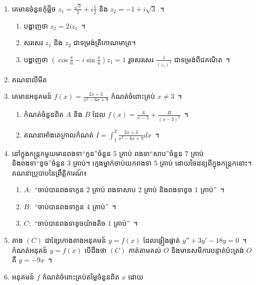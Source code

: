 \documentclass[11pt,a4paper]{myclass}
\begin{document}
	\begin{enumerate}
		\item គេមានចំនួនកុំផ្លិច $ z_1=\frac{\sqrt{3}}{2}+i\frac{1}{2} $ និង $ z_2=-1+i\sqrt{3} $~។
		\begin{enumerate}
			\item បង្ហាញថា $ z_2=2iz_1 $~។
			\item សរសេរ $ z_1 $ និង $ z_2 $ ជាទម្រង់ត្រីកោណមាត្រ។
			\item បង្ហាញថា $ \left(\cos\frac{\pi}{6}-i\sin\frac{\pi}{6}\right)z_1=1 $ រួចសរសេរ $ \frac{1}{(z_1)^4} $ ជាទម្រង់ពីជគណិត~។
		\end{enumerate}
		\item គណនាលីមីត
		\item គេមានអនុគមន៍ $ f(x)=\frac{2x+3}{x^2-6x+9} $ កំណត់ចំពោះគ្រប់ $ x\neq 3 $~។
		\begin{enumerate}
			\item កំណត់ចំនួនពិត $ A $ និង $ B $ ដែល $ f(x)=\frac{A}{x-3}+\frac{B}{(x-3)^2} $~។
			\item គណនាអាំងតេក្រាលកំណត់ $ I=\int_{1}^{2}\frac{2x+3}{x^2-6x+9}dx $~។
		\end{enumerate}
		\item នៅក្នុងកន្ត្រកមួយមានពងទា``កូន''ចំនួន $ 5 $ គ្រាប់ ពងទា``សាប''ចំនួន $ 7 $ គ្រាប់ និងពងទា``ខូច''ចំនួន $ 3 $ គ្រាប់។ ក្មេងម្នាក់ចាប់យកពងទា $ 5 $ គ្រាប់ ដោយចៃដន្យពីក្នុងកន្ត្រកនោះ។
		គណនាប្រូបាបនៃព្រឹត្តិការណ៍៖
		\begin{enumerate}
			\item $ A: $ ``ចាប់បានពងទាកូន $ 2 $ គ្រាប់ ពងទាសាប $ 2 $ គ្រាប់ និងពងទាខូច $ 1 $ គ្រាប់''~។
			\item $ B: $ ``ចាប់បានពងទាកូន $ 4 $ គ្រាប់''~។
			\item $ C: $ ``ចាប់បានពងទាខូចយ៉ាងតិច $ 1 $ គ្រាប់''~។
		\end{enumerate}
		\item តាង $ (C) $ ជាខ្សែកោងតាងអនុគមន៍ $ y=f(x) $ ដែលផ្ទៀងផ្ទាត់ $ y''+3y'-18y=0 $~។ កំណត់អនុគន៍ $ y=f(x) $ បើដឹងថា $ (C) $ កាត់តាមគល់ $ O $ និងមានសមីការបន្ទាត់ប៉ះត្រង់ $ O $ គឺ $ y=-9x $~។
		\item អនុគមន៍ $ f $ កំណត់ចំពោះគ្រប់តម្លៃចំនួនពិត $ x $ ដោយ

\end{enumerate}
\end{document}
